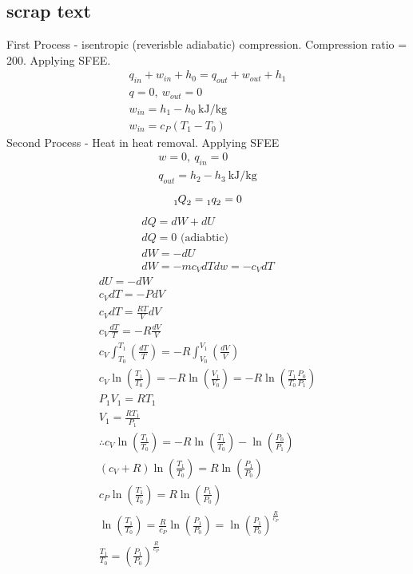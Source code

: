 \documentclass[12pt]{article}
\numberwithin{equation}{section}
\begin{document}
\begin{flushleft}
\section{scrap text}

First Process - isentropic (reverisble adiabatic) compression.
Compression ratio = 200.
Applying SFEE.
\begin{gather}
  q_{in} + w_{in} + h_0 = q_{out} + w_{out} + h_1\\
  q = 0, \ w_{out} = 0\\
  w_{in} = h_1 - h_0 \ \si{\kilo\joule\per\kg}\\
  w_{in} = c_P (T_1 - T_0)
\end{gather}
Second Process - Heat in heat removal.
Applying SFEE
\begin{gather}
  w= 0, \ q_{in} = 0\\
  q_{out} = h_2 - h_3 \ \si{\kilo\joule\per\kg}
\end{gather}
\begin{equation}
  \tensor[_1]{Q}{_2} = \tensor[_1]{q}{_2} = 0
\end{equation}
\begin{gather}
  dQ = dW + dU\\
  dQ = 0 \textrm{ (adiabtic)}\\
  dW = - dU\\
  dW = -m c_V dT
  dw = - c_V dT 
\end{gather}
\begin{gather}
  dU = -dW\\
  c_V dT = -PdV\\
  c_V dT = \frac{RT}{V} dV\\
  c_V \frac{dT}{T} = -R \frac{dV}{V}\\
  c_V\int_{T_0}^{T_1} \left( \frac{dT}{T} \right) = -R \int_{V_0}^{V_1} \left( \frac{dV}{V} \right)\\
  c_V \ln \left( \frac{T_1}{T_0} \right) = -R \ln \left( \frac{V_1}{V_0} \right) = - R \ln \left(\frac{T_1}{T_0} \frac{P_0}{P_1}\right)\\
  P_1 V_1 = R T_1\\
  V_1 = \frac{RT_1}{P_1}\\
  \therefore c_V \ln \left( \frac{T_1}{T_0} \right) = -R \ln \left(\frac{T_1}{T_0} \right) - \ln \left(\frac{P_0}{P_1}\right)\\
  (c_V + R) \ln \left(\frac{T_1}{T_0} \right) = R \ln \left(\frac{P_1}{P_0}\right)\\
  c_P \ln \left(\frac{T_1}{T_0} \right) = R \ln \left(\frac{P_1}{P_0}\right)\\
  \ln \left(\frac{T_1}{T_0} \right) = \frac{R}{c_P}\ln \left(\frac{P_1}{P_0}\right) = \ln \left(\frac{P_1}{P_0}\right)^{\frac{R}{c_P}}\\
  \frac{T_1}{T_0} = \left( \frac{P_1}{P_0} \right)^{\frac{R}{c_P}}\\
\end{gather}


\end{flushleft}
\end{document}
